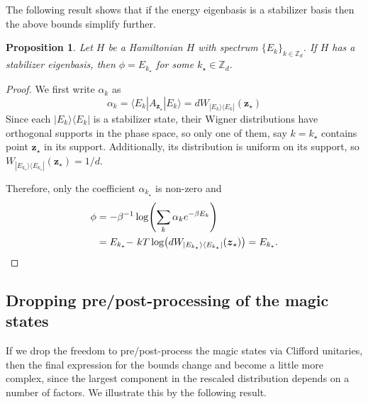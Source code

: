 \documentclass[
twocolumn,
superscriptaddress
]{revtex4-1}
\newtheorem{proposition}[theorem]{Proposition}
\def\>{\rangle}
\def\<{\langle}
\def\z{\boldsymbol{z}}
\begin{document}
The following result shows that if the energy eigenbasis is a stabilizer basis then the above bounds simplify further.
\begin{proposition} \label{sharp-phi}
	Let $H$ be a Hamiltonian $H$ with spectrum $\{E_k\}_{k \in \mathbb{Z}_d}$.
	If $H$ has a stabilizer eigenbasis, then $\phi = E_{k_{\star}}$ for some $k_{\star} \in \mathbb{Z}_d$.
\end{proposition}
\begin{proof}
	We first write $\alpha_k$ as
\begin{equation}
	\alpha_k = \<E_k | A_{\z_{\star}} |E_k\> = d W_{|E_k\>\<E_k|}(\z_{\star})
\end{equation}
Since each $|E_k\>\<E_k|$ is a stabilizer state, their Wigner distributions have orthogonal supports in the phase space, so only one of them, say $k = k_{\star}$ contains point $\z_{\star}$ in its support. 
Additionally, its distribution is uniform on its support, so $W_{|E_{k_\star}\>\<E_{k_\star}|}(\z_{\star}) = 1/d$.

Therefore, only the coefficient $\alpha_{k_{\star}}$ is non-zero and
\begin{align}
\phi &= -\beta^{-1}\log (\sum_k \alpha_k e^{-\beta E_k}) \nonumber \\
&=E_{k_{\star}} \hspace{-2pt}-\hspace{1pt} kT \log (d W_{|E_{k_\star}\>\<E_{k_\star}|}(\z_{\star})) =E_{k_{\star}}.
\end{align}

\end{proof}

\subsection*{Dropping pre/post-processing of the magic states}

If we drop the freedom to pre/post-process the magic states via Clifford unitaries, then the final expression for the bounds change and become a little more complex, since the largest component in the rescaled distribution depends on a number of factors. We illustrate this by the following result.
\end{document}
